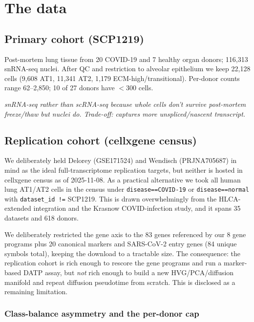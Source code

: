 \documentclass[11pt]{article}
\newcommand{\note}[1]{{\color{note}\textit{#1}}}
\begin{document}
\section{The data}

\subsection{Primary cohort (SCP1219)}

Post-mortem lung tissue from 20 COVID-19 and 7 healthy organ donors;
116{,}313 snRNA-seq nuclei. After QC and restriction to alveolar epithelium we keep
22{,}128 cells (9{,}608 AT1, 11{,}341 AT2, 1{,}179 ECM-high/transitional). Per-donor
counts range 62--2{,}850; 10 of 27 donors have $<$300 cells.

\note{snRNA-seq rather than scRNA-seq because whole cells don't survive post-mortem
freeze/thaw but nuclei do. Trade-off: captures more unspliced/nascent transcript.}

\subsection{Replication cohort (cellxgene census)}\label{sec:replication-data}

We deliberately held Delorey (GSE171524) and Wendisch (PRJNA705687) in mind as the
ideal full-transcriptome replication targets, but neither is hosted in cellxgene census
as of 2025-11-08. As a practical alternative we took all human lung AT1/AT2 cells in
the census under \texttt{disease==COVID-19} or \texttt{disease==normal} with
\texttt{dataset\_id !=} SCP1219. This is drawn overwhelmingly from the HLCA-extended
integration and the Krasnow COVID-infection study, and it spans 35 datasets and
618 donors.

We deliberately restricted the gene axis to the 83 genes referenced by our 8 gene
programs plus 20 canonical markers and SARS-CoV-2 entry genes (84 unique symbols total),
keeping the download to a tractable size. The consequence: the replication cohort is
rich enough to rescore the gene programs and run a marker-based DATP assay, but
\emph{not} rich enough to build a new HVG/PCA/diffusion manifold and repeat diffusion
pseudotime from scratch. This is disclosed as a remaining limitation.

\subsubsection*{Class-balance asymmetry and the per-donor cap}
\end{document}
